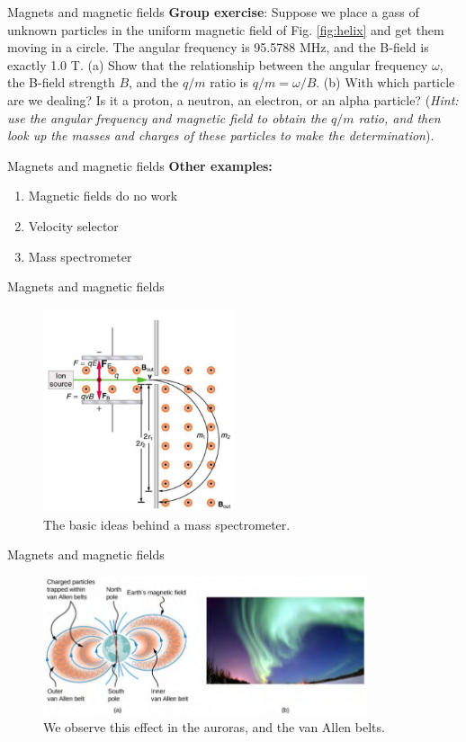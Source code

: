 \documentclass{beamer}
\begin{document}
\begin{frame}{Magnets and magnetic fields}
\textbf{Group exercise}: Suppose we place a gass of unknown particles in the uniform magnetic field of Fig. \ref{fig:helix} and get them moving in a circle.  The angular frequency is 95.5788 MHz, and the B-field is exactly 1.0 T.  (a) Show that the relationship between the angular frequency $\omega$, the B-field strength $B$, and the $q/m$ ratio is $q/m = \omega/B$. (b) With which particle are we dealing?  Is it a proton, a neutron, an electron, or an alpha particle? (\textit{Hint: use the angular frequency and magnetic field to obtain the $q/m$ ratio, and then look up the masses and charges of these particles to make the determination}).
\end{frame}

\begin{frame}{Magnets and magnetic fields}
\textbf{Other examples:}
\begin{enumerate}
\item Magnetic fields do no work
\item Velocity selector
\item Mass spectrometer
\end{enumerate}
\end{frame}

\begin{frame}{Magnets and magnetic fields}
\begin{figure}
\centering
\includegraphics[width=0.5\textwidth]{figures/massspec.png}
\caption{\label{fig:massspec} The basic ideas behind a mass spectrometer.}
\end{figure}
\end{frame}

\begin{frame}{Magnets and magnetic fields}
\begin{figure}
\centering
\includegraphics[width=0.85\textwidth]{figures/borealis.png}
\caption{\label{fig:borealis} We observe this effect in the auroras, and the van Allen belts.}
\end{figure}
\end{frame}
\end{document}
